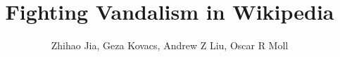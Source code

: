 \documentclass[12pt,a4paper]{article}
\begin{document}
\title{\textbf{Fighting Vandalism in Wikipedia}}
\author{
\large
Zhihao Jia,
Geza Kovacs,
Andrew Z Liu,
Oscar R Moll
\vspace{0.03in}\\
}
\date{}
\maketitle








\end{document}
